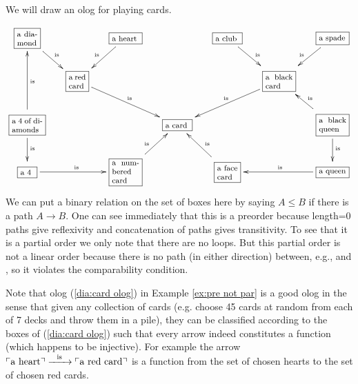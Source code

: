 \begin{exampleENG}\label{ex:pre not par}
We will draw an olog for playing cards. 
\begin{align}\label{dia:card olog}
\footnotesize
\xymatrixnocompile@=15pt{
\obox{}{.3in}{a diamond}\ar[dr]^{\tn{is}}&&\obox{}{.4in}{a heart}\ar[dl]_{\tn{is}}&&\obox{}{.35in}{a club}\ar[dr]^{\tn{is}}&&\obox{}{.4in}{a spade}\ar[dl]_{\tn{is}}\\
&\obox{}{.25in}{a red card}\ar[drr]^{\tn{is}}&&&&\obox{}{.4in}{a black card}\ar[dll]_{\tn{is}}\\
\obox{}{.45in}{a 4 of diamonds}\ar[d]^{\tn{is}}\ar[uu]_{\tn{is}}&&&\obox{}{.35in}{a card}&&&\obox{}{.4in}{a black queen}\ar[d]^{\tn{is}}\ar[ul]_{\tn{is}}\\
\obox{}{.2in}{a 4}\ar[rr]^{\tn{is}}&&\obox{}{.4in}{a numbered card}\ar[ur]^{\tn{is}}&&\obox{}{.3in}{a face card}\ar[ul]_{\tn{is}}&&\obox{}{.4in}{a queen}\ar[ll]_{\tn{is}}
}
\end{align}
We can put a binary relation on the set of boxes here by saying $A\leq B$ if there is a path $A\to B$. One can see immediately that this is a preorder because length=0 paths give reflexivity and concatenation of paths gives transitivity. To see that it is a partial order we only note that there are no loops. But this partial order is not a linear order because there is no path (in either direction) between, e.g.,  and , so it violates the comparability condition.
\end{exampleENG}

\begin{exampleRUS}\label{ex:pre not par}
\end{exampleRUS}

\begin{remarkENG}
Note that olog (\ref{dia:card olog}) in Example \ref{ex:pre not par} is a good olog in the sense that given any collection of cards (e.g. choose 45 cards at random from each of 7 decks and throw them in a pile), they can be classified according to the boxes of (\ref{dia:card olog}) such that every arrow indeed constitutes a function (which happens to be injective). For example the arrow $\textnormal{$\ulcorner$a heart$\urcorner$}\xrightarrow{\ \ \textnormal{is}\ \ }\textnormal{$\ulcorner$a red card$\urcorner$}$ is a function from the set of chosen hearts to the set of chosen red cards.
\end{remarkENG}

\begin{remarkRUS}
\end{remarkRUS}

